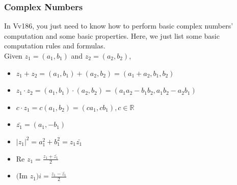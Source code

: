 \documentclass{beamer}
\begin{document}
\begin{frame}
    \frametitle{Complex Numbers}
    \hspace{1em}
    In Vv186, you just need to know how to perform basic complex numbers' computation 
    and some basic properties.
    Here, we just list some basic computation rules and formulas.\\
    Given $z_1=(a_1,b_1)$ and $z_2=(a_2,b_2)$,
\begin{itemize}
    \item $z_1+z_2=(a_1,b_1)+(a_2,b_2)=(a_1+a_2,b_1,b_2)$
    \item $z_1\cdot z_2=(a_1,b_1)\cdot (a_2,b_2)=(a_1a_2-b_1b_2,a_1b_2-a_2b_1)$
    \item $c\cdot z_1=c(a_1,b_2)=(ca_1,cb_1), c\in \mathbb{R} $
    \item $\bar{z_1}=(a_1,-b_1)$
    \item $|z_1|^2=a_1^2+b_1^2=z_1\bar{z_1}$
    \item Re $z_1= \frac{z_1+\bar{z_1}}{2}$
    \item $($Im $z_1 )i= \frac{z_1-\bar{z_1}}{2}$
\end{itemize}
\end{frame}
\end{document}
